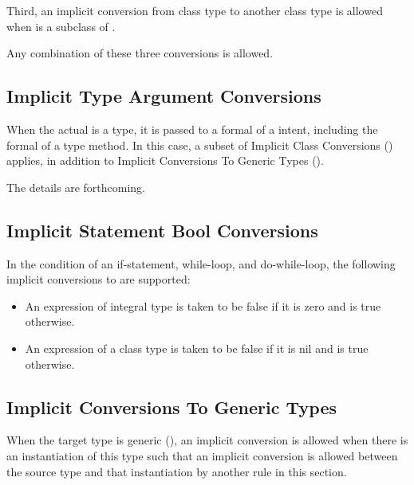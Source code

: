 Third, an implicit conversion from class type  to another class
type  is allowed when  is a subclass of .

Any combination of these three conversions is allowed.

\subsection{Implicit Type Argument Conversions}
\label{Implicit_Type_Arg_Conversions}

When the actual is a type, it is passed to a formal of a  intent,
including the  formal of a type method. In this case, a subset
of Implicit Class Conversions () applies,
in addition to Implicit Conversions To Generic Types
().

\begin{future}
The details are forthcoming.
\end{future}

\subsection{Implicit Statement Bool Conversions}
\label{Implicit_Statement_Bool_Conversions}

In the condition of an if-statement, while-loop, and do-while-loop,
the following implicit conversions to  are supported:
\begin{itemize}
\item An expression of integral type is taken to be false if it is zero and is true otherwise.
\item An expression of a class type is taken to be false if it is nil and is true otherwise.
\end{itemize}

\subsection{Implicit Conversions To Generic Types}
\label{Implicit_Generic_Type_Conversions}

When the target type  is generic (),
an implicit conversion is allowed when there is an instantiation
of this type such that an implicit conversion is allowed between
the source type and that instantiation by another rule in this section.

